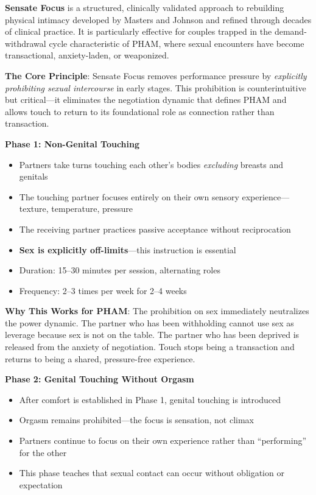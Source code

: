 \documentclass[12pt,openany]{book}
\numberwithin{equation}{chapter}
\begin{document}
\textbf{Sensate Focus} is a structured, clinically validated approach to rebuilding physical intimacy developed by Masters and Johnson and refined through decades of clinical practice. It is particularly effective for couples trapped in the demand-withdrawal cycle characteristic of PHAM, where sexual encounters have become transactional, anxiety-laden, or weaponized.

\textbf{The Core Principle}: Sensate Focus removes performance pressure by \textit{explicitly prohibiting sexual intercourse} in early stages. This prohibition is counterintuitive but critical---it eliminates the negotiation dynamic that defines PHAM and allows touch to return to its foundational role as connection rather than transaction.

\textbf{Phase 1: Non-Genital Touching}
\begin{itemize}
    \item Partners take turns touching each other's bodies \textit{excluding} breasts and genitals
    \item The touching partner focuses entirely on their own sensory experience---texture, temperature, pressure
    \item The receiving partner practices passive acceptance without reciprocation
    \item \textbf{Sex is explicitly off-limits}---this instruction is essential
    \item Duration: 15--30 minutes per session, alternating roles
    \item Frequency: 2--3 times per week for 2--4 weeks
\end{itemize}

\textbf{Why This Works for PHAM}: The prohibition on sex immediately neutralizes the power dynamic. The partner who has been withholding cannot use sex as leverage because sex is not on the table. The partner who has been deprived is released from the anxiety of negotiation. Touch stops being a transaction and returns to being a shared, pressure-free experience.

\textbf{Phase 2: Genital Touching Without Orgasm}
\begin{itemize}
    \item After comfort is established in Phase 1, genital touching is introduced
    \item Orgasm remains prohibited---the focus is sensation, not climax
    \item Partners continue to focus on their own experience rather than ``performing'' for the other
    \item This phase teaches that sexual contact can occur without obligation or expectation
\end{itemize}
\end{document}

